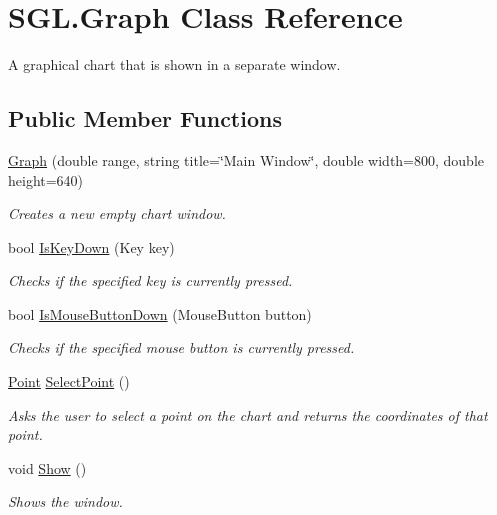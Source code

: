 \hypertarget{class_s_g_l_1_1_graph}{}\section{S\+G\+L.\+Graph Class Reference}
\label{class_s_g_l_1_1_graph}


A graphical chart that is shown in a separate window.  


\subsection*{Public Member Functions}
\begin{DoxyCompactItemize}
\item 
\mbox{\hyperlink{class_s_g_l_1_1_graph_ae49041037b01a96e44314f7b3b9b6166}{Graph}} (double range, string title=\char`\"{}Main Window\char`\"{}, double width=800, double height=640)
\begin{DoxyCompactList}\small\item\em Creates a new empty chart window. \end{DoxyCompactList}\item 
bool \mbox{\hyperlink{class_s_g_l_1_1_graph_aba994e0f4ec93be3f3d181fa128db070}{Is\+Key\+Down}} (Key key)
\begin{DoxyCompactList}\small\item\em Checks if the specified key is currently pressed. \end{DoxyCompactList}\item 
bool \mbox{\hyperlink{class_s_g_l_1_1_graph_a274ab575056c833cd3f3f45770c20b58}{Is\+Mouse\+Button\+Down}} (Mouse\+Button button)
\begin{DoxyCompactList}\small\item\em Checks if the specified mouse button is currently pressed. \end{DoxyCompactList}\item 
\mbox{\hyperlink{struct_s_g_l_1_1_point}{Point}} \mbox{\hyperlink{class_s_g_l_1_1_graph_a02daa8a4a7e540677d76e9a0ac40039d}{Select\+Point}} ()
\begin{DoxyCompactList}\small\item\em Asks the user to select a point on the chart and returns the coordinates of that point. \end{DoxyCompactList}\item 
void \mbox{\hyperlink{class_s_g_l_1_1_graph_ac67339a4d4304b41258344692535c139}{Show}} ()
\begin{DoxyCompactList}\small\item\em Shows the window. \end{DoxyCompactList}\item 

\end{DoxyCompactItemize}
